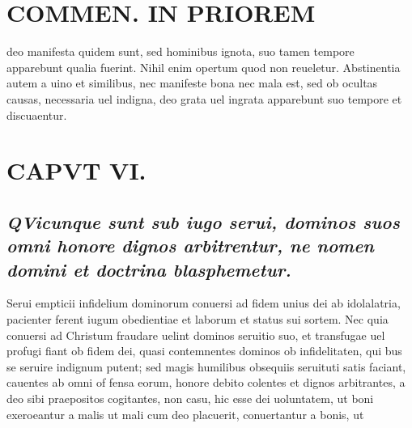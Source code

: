 \documentclass{article}
\begin{document}
\begin{pages}
\section*{COMMEN. IN PRIOREM }
\marginpar{[ p.152 ]}\pstart deo manifesta quidem sunt, sed hominibus ignota, suo tamen tempore apparebunt qualia fuerint. Nihil enim opertum quod non reueletur. Abstinentia autem a uino et similibus, nec manifeste bona nec mala est, sed ob ocultas causas, necessaria uel indigna, deo grata uel ingrata apparebunt suo tempore et discuaentur.  \pend
\endnumbering\beginnumbering\section{CAPVT VI.}
{}
\subsection*{\textit{\huge\textbf{Q}\normalsize Vicunque sunt sub iugo serui, dominos suos omni honore dignos arbitrentur, ne nomen domini et doctrina blasphemetur. }}\pstart Serui empticii infidelium dominorum conuersi ad fidem unius dei ab idolalatria, pacienter ferent iugum obedientiae et laborum et status sui sortem. Nec quia conuersi ad Christum fraudare uelint dominos seruitio suo, et transfugae uel profugi fiant ob fidem dei, quasi contemnentes dominos ob infidelitaten, qui bus se seruire indignum putent; sed magis humilibus obsequiis seruituti satis faciant, cauentes ab omni of fensa eorum, honore debito colentes et dignos arbitrantes, a deo sibi praepositos cogitantes, non casu, hic esse dei uoluntatem, ut boni exeroeantur a malis ut mali cum deo placuerit, conuertantur a bonis, ut  \pend

\end{pages}
\end{document}
